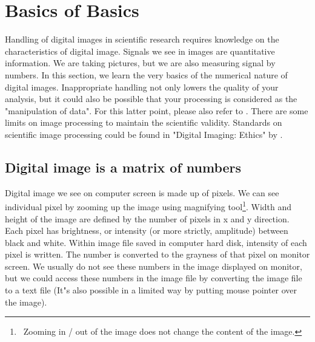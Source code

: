 
\section{Basics of Basics}

Handling of digital images in scientific research requires knowledge on
the characteristics of digital image. Signals we see in images are
quantitative information. We are taking pictures, but we are also
measuring signal by numbers. In this section, we learn the very basics
of the numerical nature of digital images. Inappropriate handling not
only lowers the quality of your analysis, but it could also be possible
that your processing is considered as the "manipulation
of data". For this latter point, please also refer to
\citet{Rossner2004}. There are some limits on image processing
to maintain the scientific validity. Standards on scientific image
processing could be found in "Digital Imaging:
Ethics" by \citet{cromey2007}. 

\subsection{Digital image is a matrix of numbers}
\label{subsec:imageEQmatrix}
Digital image we see on computer screen is made up of pixels. We can see
individual pixel by zooming up the image using magnifying
tool\footnote{\ Zooming in / out of the image does not change the
content of the image.}. Width and height of the image are defined by
the number of pixels in x and y direction. Each pixel has brightness,
or intensity (or more strictly, amplitude) between black and white.
Within image file saved in computer hard disk, intensity of each pixel
is written. The number is converted to the grayness of that pixel on
monitor screen. We usually do not see these numbers in the image
displayed on monitor, but we could access these numbers in the image
file by converting the image file to a text file (It"s
also possible in a limited way by putting mouse pointer over the
image). 

